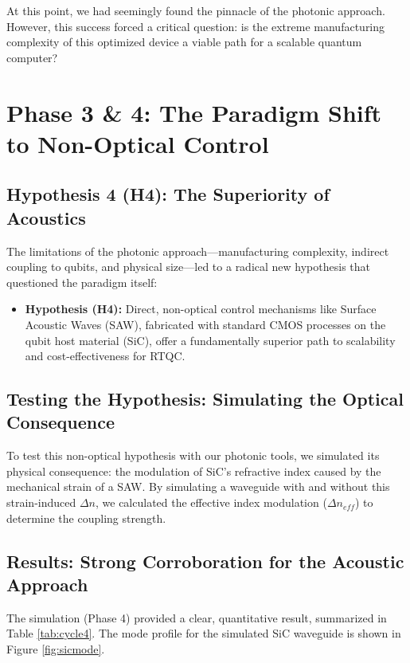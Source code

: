\documentclass[12pt, a4paper, numbers]{report}
\begin{document}
At this point, we had seemingly found the pinnacle of the photonic approach. However, this success forced a critical question: is the extreme manufacturing complexity of this optimized device a viable path for a scalable quantum computer?

\chapter{Phase 3 \& 4: The Paradigm Shift to Non-Optical Control}
\section{Hypothesis 4 (H4): The Superiority of Acoustics}
The limitations of the photonic approach—manufacturing complexity, indirect coupling to qubits, and physical size—led to a radical new hypothesis that questioned the paradigm itself:
\begin{itemize}
    \item \textbf{Hypothesis (H4):} Direct, non-optical control mechanisms like Surface Acoustic Waves (SAW), fabricated with standard CMOS processes on the qubit host material (SiC), offer a fundamentally superior path to scalability and cost-effectiveness for RTQC.
\end{itemize}

\section{Testing the Hypothesis: Simulating the Optical Consequence}
To test this non-optical hypothesis with our photonic tools, we simulated its physical consequence: the modulation of SiC's refractive index caused by the mechanical strain of a SAW. By simulating a waveguide with and without this strain-induced $\Delta n$, we calculated the effective index modulation ($\Delta n_{eff}$) to determine the coupling strength.

\section{Results: Strong Corroboration for the Acoustic Approach}
The simulation (Phase 4) provided a clear, quantitative result, summarized in Table \ref{tab:cycle4}. The mode profile for the simulated SiC waveguide is shown in Figure \ref{fig:sicmode}.
\end{document}
